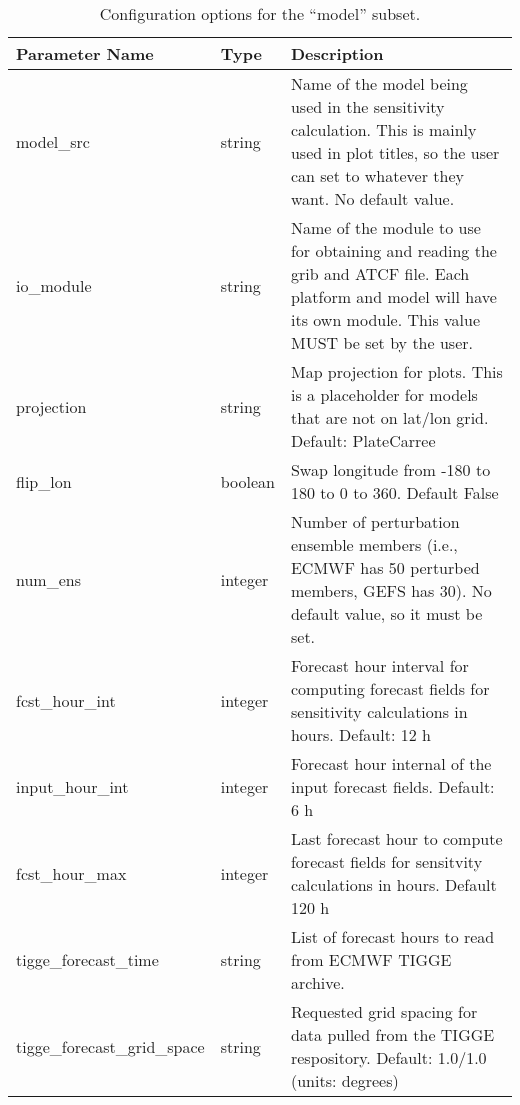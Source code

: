 \documentclass[psfig,12pt]{article}
\begin{document}
\begin{table}[H]
\caption{Configuration options for the ``model'' subset.}
\begin{center}
\begin{tabular}{|p{1.75in}|p{0.5in}|p{4.00in}|}
\hline
Parameter Name & Type & Description \\  \hline\hline

model\_src & string & Name of the model being used in the sensitivity calculation.  This is mainly used in
plot titles, so the user can set to whatever they want.  No default value.  \\  \hline

io\_module & string & Name of the module to use for obtaining and reading the grib and ATCF file.  Each
platform and model will have its own module.  This value MUST be set by the user. \\  \hline

projection & string & Map projection for plots.  This is a placeholder for models that are not on
lat/lon grid.  Default:  PlateCarree \\ \hline

flip\_lon & boolean & Swap longitude from -180 to 180 to 0 to 360.  Default False \\ \hline

num\_ens & integer & Number of perturbation ensemble members (i.e., ECMWF has 50 perturbed members, 
GEFS has 30).  No default value, so it must be set. \\  \hline

fcst\_hour\_int & integer & Forecast hour interval for computing forecast fields for sensitivity 
calculations in hours.  Default:  12 h \\  \hline

input\_hour\_int & integer & Forecast hour internal of the input forecast fields.  Default:  6 h \\ \hline

fcst\_hour\_max & integer & Last forecast hour to compute forecast fields for sensitvity 
calculations in hours.  Default 120 h \\  \hline

tigge\_forecast\_time & string & List of forecast hours to read from ECMWF TIGGE archive. \\ \hline

tigge\_forecast\_grid\_space & string & Requested grid spacing for data pulled from the 
TIGGE respository.  Default: 1.0/1.0 (units: degrees) \\ \hline


\end{tabular}
\end{center}
\end{table}
\end{document}
